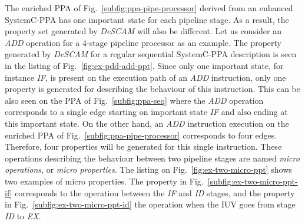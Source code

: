 The enriched PPA of Fig.~\ref{subfig:ppa-pipe-processor} derived from an enhanced SystemC-PPA has one important state for each pipeline stage. As a result, the property set generated by \textit{DeSCAM} will also be different. Let us consider an \textit{ADD} operation for a 4-stage pipeline processor as an example. The property generated by \textit{DeSCAM} for a regular sequential SystemC-PPA description is seen in the listing of Fig.~\ref{fig:ex-pdd-add-ppt}. Since only one important state, for instance \textit{IF}, is present on the execution path of an \textit{ADD} instruction, only one property is generated for describing the behaviour of this instruction. This can be also seen on the PPA of Fig.~\ref{subfig:ppa-seq} where the \textit{ADD} operation corresponds to a single edge starting on important state \textit{IF} and also ending at this important state. On the other hand, an \textit{ADD} instruction execution on the enriched PPA of Fig.~\ref{subfig:ppa-pipe-processor} corresponds to four edges. Therefore, four properties will be generated for this single instruction. These operations describing the behaviour between two pipeline stages are named \textit{micro operations}, or \textit{micro properties}. The listing on Fig.~\ref{fig:ex-two-micro-ppt} shows two examples of micro properties. The property in Fig.~\ref{subfig:ex-two-micro-ppt-if} corresponds to the operation between the \textit{IF} and \textit{ID} stages, and the property in Fig.~\ref{subfig:ex-two-micro-ppt-id} the operation when the IUV goes from stage \textit{ID} to \textit{EX}.

